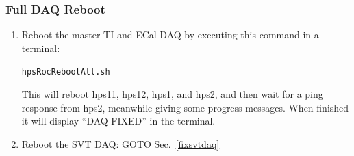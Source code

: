 \documentclass[12pt]{article}
\begin{document}
\subsubsection{Full DAQ Reboot}
\label{fixdaqbig}

\begin{enumerate}
\item Reboot the master TI and ECal DAQ by executing this command in a terminal:
\newline
\centerline{\texttt{hpsRocRebootAll.sh}}
This will reboot hps11, hps12, hps1, and hps2, and then wait for a ping response from hps2, meanwhile giving some progress messages.  When finished it will display ``DAQ FIXED'' in the terminal.

\item Reboot the SVT DAQ: GOTO Sec.~\ref{fixsvtdaq}

\end{enumerate}

%
%
\end{document}
